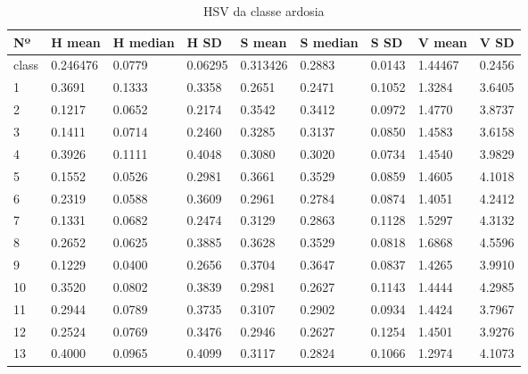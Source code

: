 \begin{anexosenv}
\begin{table}[htbp!]
\centering
\caption{HSV da classe ardosia}
\label{tab:cores_classe_ardosia}
\begin{tabular}{|l|l|l|l|l|l|l|l|l|}
\hline
Nº & H mean & H median & H SD & S mean & S median & S SD & V mean & V SD \\ \hline
class & 0.246476 & 0.0779   & 0.06295              & 0.313426 & 0.2883   & 0.0143               & 1.44467 & 0.2456               \\\hline
1    & 0.3691   & 0.1333   & 0.3358               & 0.2651   & 0.2471   & 0.1052               & 1.3284  & 3.6405               \\
2    & 0.1217   & 0.0652   & 0.2174               & 0.3542   & 0.3412   & 0.0972               & 1.4770  & 3.8737               \\
3    & 0.1411   & 0.0714   & 0.2460               & 0.3285   & 0.3137   & 0.0850               & 1.4583  & 3.6158               \\
4    & 0.3926   & 0.1111   & 0.4048               & 0.3080   & 0.3020   & 0.0734               & 1.4540  & 3.9829               \\
5    & 0.1552   & 0.0526   & 0.2981               & 0.3661   & 0.3529   & 0.0859               & 1.4605  & 4.1018               \\
6    & 0.2319   & 0.0588   & 0.3609               & 0.2961   & 0.2784   & 0.0874               & 1.4051  & 4.2412               \\
7    & 0.1331   & 0.0682   & 0.2474               & 0.3129   & 0.2863   & 0.1128               & 1.5297  & 4.3132               \\
8    & 0.2652   & 0.0625   & 0.3885               & 0.3628   & 0.3529   & 0.0818               & 1.6868  & 4.5596               \\
9    & 0.1229   & 0.0400   & 0.2656               & 0.3704   & 0.3647   & 0.0837               & 1.4265  & 3.9910               \\
10   & 0.3520   & 0.0802   & 0.3839               & 0.2981   & 0.2627   & 0.1143               & 1.4444  & 4.2985               \\
11   & 0.2944   & 0.0789   & 0.3735               & 0.3107   & 0.2902   & 0.0934               & 1.4424  & 3.7967               \\
12   & 0.2524   & 0.0769   & 0.3476               & 0.2946   & 0.2627   & 0.1254               & 1.4501  & 3.9276               \\
13   & 0.4000   & 0.0965   & 0.4099               & 0.3117   & 0.2824   & 0.1066               & 1.2974  & 4.1073               \\

\end{tabular}
\end{table}
\end{anexosenv}
